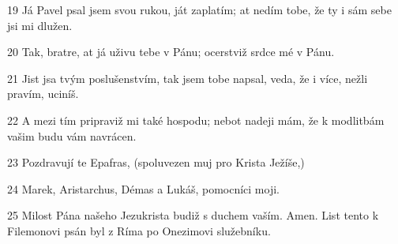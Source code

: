 \par 19 Já Pavel psal jsem svou rukou, ját zaplatím; at nedím tobe, že ty i sám sebe jsi mi dlužen.
\par 20 Tak, bratre, at já uživu tebe v Pánu; ocerstviž srdce mé v Pánu.
\par 21 Jist jsa tvým poslušenstvím, tak jsem tobe napsal, veda, že i více, nežli pravím, uciníš.
\par 22 A mezi tím pripraviž mi také hospodu; nebot nadeji mám, že k modlitbám vašim budu vám navrácen.
\par 23 Pozdravují te Epafras, (spoluvezen muj pro Krista Ježíše,)
\par 24 Marek, Aristarchus, Démas a Lukáš, pomocníci moji.
\par 25 Milost Pána našeho Jezukrista budiž s duchem vaším. Amen. List tento k Filemonovi psán byl z Ríma po Onezimovi služebníku.


